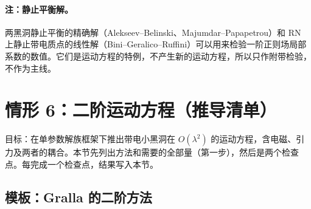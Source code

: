 \documentclass[11pt,a4paper]{ctexart}
\numberwithin{equation}{section}
\begin{document}
\paragraph{注：静止平衡解。}两黑洞静止平衡的精确解（Alekseev--Belinski、Majumdar--Papapetrou）和 RN 上静止带电质点的线性解（Bini--Geralico--Ruffini）可以用来检验一阶正则场局部系数的数值。它们是运动方程的特例，不产生新的运动方程，所以只作附带检验，不作为主线。

\section[情形 6：二阶运动方程]{情形 6：二阶运动方程（推导清单）}
\label{sec:L6}

目标：在单参数解族框架下推出带电小黑洞在 $O(\lambda^2)$ 的运动方程，含电磁、引力及两者的耦合。本节先列出方法和需要的全部量（第一步），然后是两个检查点。每完成一个检查点，结果写入本节。

\subsection{模板：Gralla 的二阶方法}
\label{sec:L6template}
\end{document}
